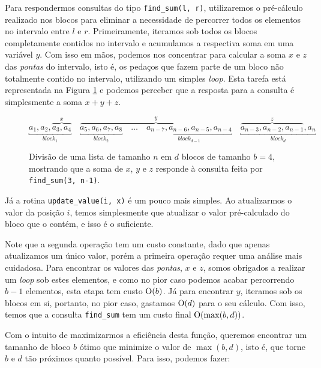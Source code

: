 Para respondermos consultas do tipo \texttt{find\_sum(l, r)}, utilizaremos o pré-cálculo realizado nos blocos para eliminar a necessidade de percorrer todos os elementos no intervalo entre $l$ e $r$. Primeiramente, iteramos sob todos os blocos completamente contidos no intervalo e acumulamos a respectiva soma em uma variável $y$. Com isso em mãos, podemos nos concentrar para calcular a soma $x$ e $z$ das \emph{pontas} do intervalo, isto é, os pedaços que fazem parte de um bloco não totalmente contido no intervalo, utilizando um simples \emph{loop}. Esta tarefa está representada na Figura \ref{fig:sqrt-decomp-blocks} e podemos perceber que a resposta para a consulta é simplesmente a soma $x + y + z$.

\begin{figure}
    \centering
    \begin{equation*}
        \underbracket{a_1, a_2, \overbrace{a_3, a_4}^x}_{block_1} \quad
        \overbrace{
            \underbracket{a_5, a_6, a_7, a_8}_{block_2} \quad
            \dots \quad
            \underbracket{a_{n-7}, a_{n-6}, a_{n-5}, a_{n-4}}_{block_{d-1}}
        }^y \quad
        \underbracket{\overbrace{a_{n-3}, a_{n-2}, a_{n-1}}^z, a_n}_{block_d}
    \end{equation*}
    \caption{Divisão de uma lista de tamanho $n$ em $d$ blocos de tamanho $b = 4$, mostrando que a soma de $x$, $y$ e $z$ responde à consulta feita por \texttt{find\_sum(3, n-1)}.}
    \label{fig:sqrt-decomp-blocks}
\end{figure}

Já a rotina \texttt{update\_value(i, x)} é um pouco mais simples. Ao atualizarmos o valor da posição $i$, temos simplesmente que atualizar o valor pré-calculado do bloco que o contém, e isso é o suficiente.

Note que a segunda operação tem um custo constante, dado que apenas atualizamos um único valor, porém a primeira operação requer uma análise mais cuidadosa. Para encontrar os valores das \emph{pontas}, $x$ e $z$, somos obrigados a realizar um \emph{loop} sob estes elementos, e como no pior caso podemos acabar percorrendo $b-1$ elementos, esta etapa tem custo $\mathrm{O}(b)$. Já para encontrar $y$, iteramos sob os blocos em si, portanto, no pior caso, gastamos $\mathrm{O}(d)$ para o seu cálculo. Com isso, temos que a consulta \texttt{find\_sum} tem um custo final $\mathrm{O}(\max(b, d))$.

Com o intuito de maximizarmos a eficiência desta função, queremos encontrar um tamanho de bloco $b$ ótimo que minimize o valor de $\max(b, d)$, isto é, que torne $b$ e $d$ tão próximos quanto possível. Para isso, podemos fazer:

